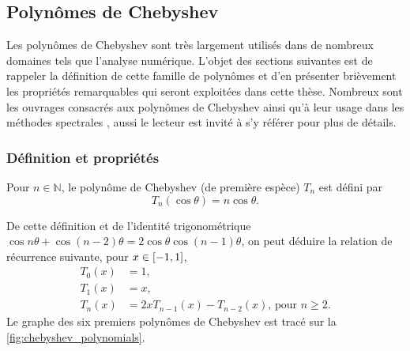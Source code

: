 


\subsection{Polynômes de Chebyshev}
Les polynômes de Chebyshev sont très largement utilisés dans de nombreux domaines tels que l'analyse numérique.
L'objet des sections suivantes est de rappeler la définition de cette famille 
de polynômes et d'en présenter brièvement les propriétés remarquables qui seront exploitées dans cette thèse. 
Nombreux sont les ouvrages consacrés aux polynômes de Chebyshev \cite{mason2002, gil2007} ainsi qu'à leur usage dans les méthodes spectrales \cite{boyd2001, canuto2006}, aussi le lecteur est invité à s'y référer pour plus de détails.


\subsubsection{Définition et propriétés}
\begin{definition}
	Pour $n \in \mathbb{N}$, le polynôme de Chebyshev (de première espèce) $T_n$ est défini par%
	\begin{equation}
		T_n(\cos \theta) = n \cos \theta.
		\label{eq:chebyshev_trigo}
	\end{equation}
\end{definition}
De cette définition et de l'identité trigonométrique $\cos n\theta + \cos (n-2)\theta = 2\cos \theta \cos (n-1)\theta$, on peut déduire la relation de récurrence suivante, pour $x \in \left[ -1, 1 \right]$, 
\begin{align}[left = \empheqlbrace\,]
	T_0(x) &= 1, \nonumber\\
	T_1(x) &= x, \nonumber\\
	T_n(x) &= 2x T_{n-1}(x) - T_{n-2}(x) \text{,\ pour\ } n \geq 2.
	\label{eq:chebyshev_recurrence}
\end{align}
Le graphe des six premiers polynômes de Chebyshev est tracé sur la \autoref{fig:chebyshev_polynomials}.\par

